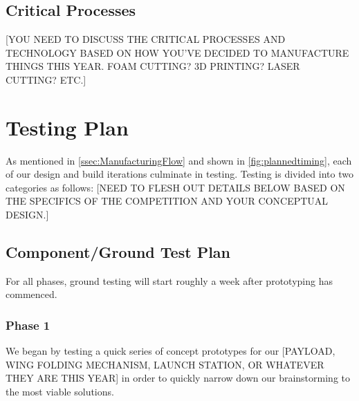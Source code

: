 \documentclass[proposal]{byu-aero}
\begin{document}
\subsection{Critical Processes}
\label{ssec:CriticalProcesses}

{\color{BYUred}[YOU NEED TO DISCUSS THE CRITICAL PROCESSES AND TECHNOLOGY BASED ON HOW YOU'VE DECIDED TO MANUFACTURE THINGS THIS YEAR.  FOAM CUTTING? 3D PRINTING? LASER CUTTING? ETC.]}
\lipsum[3]





\section{Testing Plan} %
\label{sec:TestingPlan}

As mentioned in \cref{ssec:ManufacturingFlow} and shown in \cref{fig:plannedtiming}, each of our design and build iterations culminate in testing.  Testing is divided into two categories as follows:
{\color{BYUred}[NEED TO FLESH OUT DETAILS BELOW BASED ON THE SPECIFICS OF THE COMPETITION AND YOUR CONCEPTUAL DESIGN.]}


\subsection{Component/Ground Test Plan}
\label{ssec:GroundTestingPlan}

For all phases, ground testing will start roughly a week after prototyping has commenced. 

\subsubsection{Phase 1} We began by testing a quick series of concept prototypes for our {\color{BYUred}[PAYLOAD, WING FOLDING MECHANISM, LAUNCH STATION, OR WHATEVER THEY ARE THIS YEAR]} in order to quickly narrow down our brainstorming to the most viable solutions.
\end{document}
